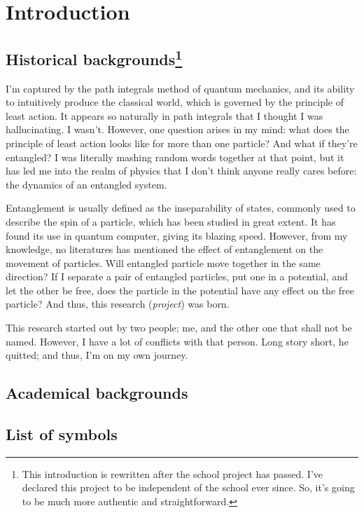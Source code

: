 \chapter{Introduction}

\section[Historical backgrounds]{Historical backgrounds\footnote{This introduction is rewritten after the school project has passed. I've declared this project to be independent of the school ever since. So, it's going to be much more authentic and straightforward.}}

I'm captured by the path integrals method of quantum mechanics, and its ability to intuitively produce the classical world, which is governed by the principle of least action. It appears so naturally in path integrals that I thought I was hallucinating. I wasn't. However, one question arises in my mind: what does the principle of least action looks like for more than one particle? And what if they're entangled? I was literally mashing random words together at that point, but it has led me into the realm of physics that I don't think anyone really cares before: the dynamics of an entangled system.

Entanglement is usually defined as the inseparability of states, commonly used to describe the spin of a particle, which has been studied in great extent. It has found its use in quantum computer, giving its blazing speed. However, from my knowledge, no literatures has mentioned the effect of entanglement on the movement of particles. Will entangled particle move together in the same direction? If I separate a pair of entangled particles, put one in a potential, and let the other be free, does the particle in the potential have any effect on the free particle? And thus, this research (\emph{project}) was born.

This research started out by two people; me, and the other one that shall not be named. However, I have a lot of conflicts with that person. Long story short, he quitted; and thus, I'm on my own journey.

\section{Academical backgrounds}

\section{List of symbols}